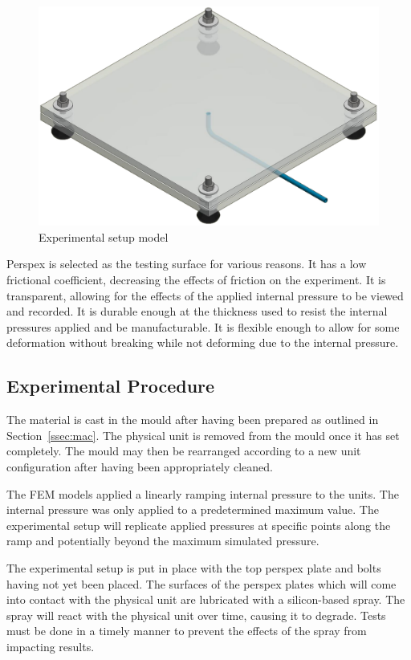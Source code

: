 \begin{figure}[H]
	\centering
	\includegraphics[width=\textwidth]{ER.png}
	\caption{Experimental setup model}
	\label{fig:exp}
\end{figure}

Perspex is selected as the testing surface for various reasons. It has a low frictional coefficient, decreasing the effects of friction on the experiment. It is transparent, allowing for the effects of the applied internal pressure to be viewed and recorded. It is durable enough at the thickness used to resist the internal pressures applied and be manufacturable. It is flexible enough to allow for some deformation without breaking while not deforming due to the internal pressure.

\subsection{Experimental Procedure}
\label{ssec:ep}

The material is cast in the mould after having been prepared as outlined in Section~\ref{ssec:mac}. The physical unit is removed from the mould once it has set completely. The mould may then be rearranged according to a new unit configuration after having been appropriately cleaned.

The FEM models applied a linearly ramping internal pressure to the units. The internal pressure was only applied to a predetermined maximum value. The experimental setup will replicate applied pressures at specific points along the ramp and potentially beyond the maximum simulated pressure.

The experimental setup is put in place with the top perspex plate and bolts having not yet been placed. The surfaces of the perspex plates which will come into contact with the physical unit are lubricated with a silicon-based spray. The spray will react with the physical unit over time, causing it to degrade. Tests must be done in a timely manner to prevent the effects of the spray from impacting results.

